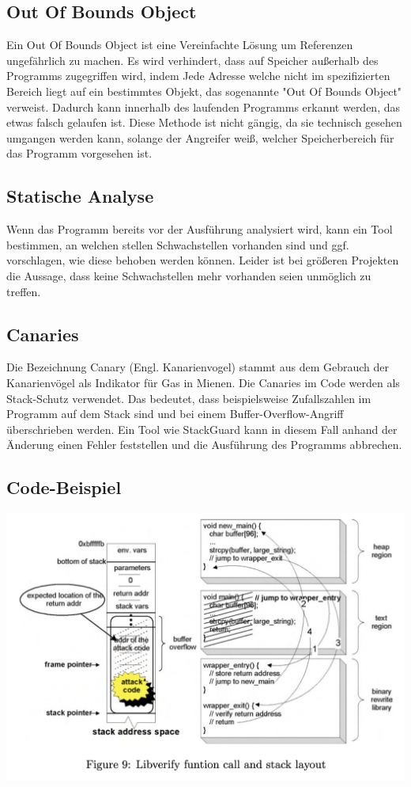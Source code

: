 \subsection{Out Of Bounds Object}
Ein Out Of Bounds Object ist eine Vereinfachte Lösung um Referenzen ungefährlich zu machen.
Es wird verhindert, dass auf Speicher außerhalb des Programms zugegriffen wird, indem Jede
Adresse welche nicht im spezifizierten Bereich liegt auf ein bestimmtes Objekt, das sogenannte
"Out Of Bounds Object" verweist. Dadurch kann innerhalb des laufenden Programms erkannt werden, das
etwas falsch gelaufen ist. Diese Methode ist nicht gängig, da sie technisch gesehen
umgangen werden kann, solange der Angreifer weiß, welcher Speicherbereich für das Programm
vorgesehen ist.

\subsection{Statische Analyse}
Wenn das Programm bereits vor der Ausführung analysiert wird, kann ein
Tool bestimmen, an welchen stellen Schwachstellen vorhanden sind und
ggf. vorschlagen, wie diese behoben werden können. Leider ist bei größeren
Projekten die Aussage, dass keine Schwachstellen mehr vorhanden seien
unmöglich zu treffen.

\subsection{Canaries}
Die Bezeichnung Canary (Engl. Kanarienvogel) stammt aus dem Gebrauch der Kanarienvögel als
Indikator für Gas in Mienen. Die Canaries im Code werden als Stack-Schutz verwendet. Das bedeutet,
dass beispielsweise Zufallszahlen im Programm auf dem Stack sind und bei einem Buffer-Overflow-Angriff
überschrieben werden. Ein Tool wie StackGuard kann in diesem Fall anhand der Änderung einen Fehler feststellen und
die Ausführung des Programms abbrechen.


\subsection{Code-Beispiel}
\begin{center}
    \includegraphics[width=\textwidth,height=0.75\textheight,keepaspectratio]{images/Libverify.png}
\end{center}

